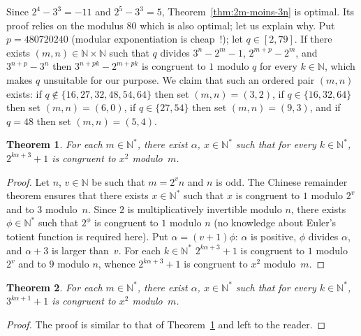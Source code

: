 \documentclass[12pt]{article}
\newcommand{\bZ}{\mathbb{Z}}
\newcommand{\bN}{\mathbb{N}} %
\newcommand{\bNast}{\bN^*}
\newtheorem{theorem}{Theorem}
\theoremstyle{definition}
\begin{document}
   Since $2^4 - 3^3 = - 11$ and $2^5 - 3^3 = 5$,
   Theorem~\ref{thm:2m-moins-3n} is optimal.
   Its proof relies on the modulus $80$ which is also optimal; let us explain why.
   Put $p = 480720240$ (modular exponentiation is cheap~!);
   let $q \in [2, 79]$.
   If there exists $(m, n) \in \bN \times \bN$ such that
   $q$ divides $3^n - 2^m - 1$, $2^{m + p} - 2^m$, and $3^{n + p} - 3^n$
   then
   $3^{n + pk} - 2^{m + pk}$ is congruent to $1$ modulo $q$ for every $k \in \bN$,
   which makes $q$ unsuitable for our purpose.
   We claim that such an ordered pair $(m, n)$ exists: 
   if $q \notin \{ 16, 27, 32, 48, 54, 64 \}$ then set $(m, n) = (3, 2)$,
   if $q \in \{ 16, 32, 64 \}$ then set $(m, n) = (6, 0)$, 
   if $q \in \{ 27, 54 \}$ then set $(m, n) = (9, 3)$, and 
   if $q = 48$ then set $(m, n) = (5, 4)$.    

   \begin{theorem} \label{thm:pow-2-square-mod}
     For each $m \in \bNast$,
     there exist $\alpha$, $x \in \bNast$ such that for every  $k \in \bNast$, 
     $2^{k \alpha + 3} + 1$ is congruent to $x^2$  modulo~$m$.
   \end{theorem}



   \begin{proof}
     Let $n$, $v \in \bN$ be such that $m = 2^v n$ and $n$ is odd.
     The Chinese remainder theorem ensures that there exists $x \in \bNast$ such that
     $x$ is congruent to $1$ modulo $2^v$ and to $3$ modulo~$n$.
     Since $2$ is multiplicatively invertible modulo $n$,
     there exists $\phi \in \bNast$ such that $2^\phi$ is congruent to $1$ modulo $n$
     (no knowledge about Euler's totient function is required here).
     Put $\alpha = (v + 1) \phi$:
     $\alpha$ is positive,
     $\phi$ divides $\alpha$, and
     $\alpha + 3$ is larger than~$v$.
     For each $k \in \bNast$
     $2^{k \alpha + 3} + 1$ is congruent
     to $1$ modulo $2^v$ and
     to $9$ modulo $n$,
     whence $2^{k \alpha + 3} + 1$ is congruent to $x^2$ modulo~$m$.
   \end{proof}
     
   \begin{theorem}
     For each $m \in \bNast$,
     there exist $\alpha$, $x \in \bNast$ such that for every  $k \in \bNast$, 
     $3^{k \alpha + 1} + 1$ is congruent to $x^2$ modulo~$m$.
   \end{theorem}

   \begin{proof}
     The proof is similar to that of Theorem~\ref{thm:pow-2-square-mod} and left to the reader.
    \end{proof} 
\end{document}
